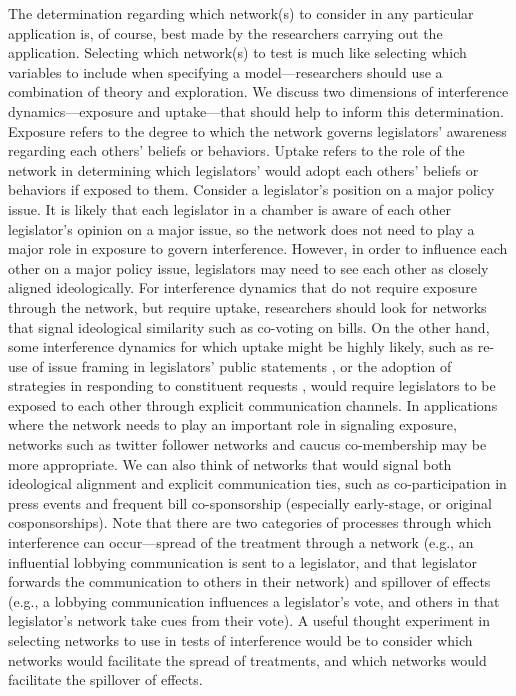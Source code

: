 \documentclass[12pt]{article}
\begin{document}
The determination regarding which network(s) to consider in any particular application is, of course, best made by the researchers carrying out the application. Selecting which network(s) to test is much like selecting which variables to include when specifying a model---researchers should use a combination of theory and exploration. We discuss two dimensions of interference dynamics---exposure and uptake---that should help to inform this determination. Exposure refers to the degree to which the network governs legislators' awareness regarding each others' beliefs or behaviors. Uptake refers to the role of the network in determining which legislators' would adopt each others' beliefs or behaviors if exposed to them. Consider a legislator's position on a major policy issue. It is likely that each legislator in a chamber is aware of each other legislator's opinion on a major issue, so the network does not need to play a major role in exposure to govern interference. However, in order to influence each other on a major policy issue, legislators may need to see each other as closely aligned ideologically. For interference dynamics that do not require exposure through the network, but require uptake, researchers should look for networks that signal ideological similarity such as co-voting on bills. On the other hand, some interference dynamics for which uptake might be highly likely, such as re-use of issue framing in legislators' public statements \citep{lin2016uncovering}, or the adoption of strategies in responding to constituent requests \citep{grose2015explaining}, would require legislators to be exposed to each other through explicit communication channels.  In applications where the network needs to play an important role in signaling exposure, networks such as twitter follower networks and caucus co-membership may be more appropriate. We can also think of networks that would signal both ideological alignment and explicit communication ties, such as co-participation in press events and frequent bill co-sponsorship (especially early-stage, or original cosponsorships).  Note that there are two categories of processes through which interference can occur---spread of the treatment through a network (e.g., an influential lobbying communication is sent to a legislator, and that legislator forwards the communication to others in their network) and spillover of effects (e.g., a lobbying communication influences a legislator's vote, and others in that legislator's network take cues from their vote). A useful thought experiment in selecting networks to use in tests of interference would be to consider which networks would facilitate the spread of treatments, and which networks would facilitate the spillover of effects.
\end{document}
